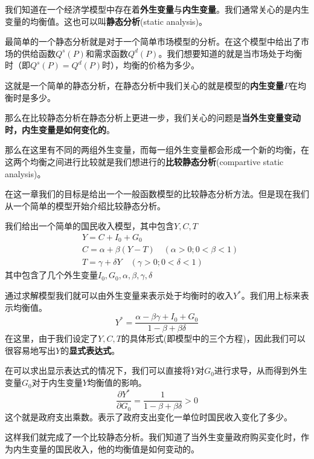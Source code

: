 \documentclass[UTF8,12pt]{ctexart}
\numberwithin{equation}{section} %
\numberwithin{figure}{section}
\numberwithin{table}{section}
\begin{document}
	我们知道在一个经济学模型中存在着\textbf{外生变量}与\textbf{内生变量}。我们通常关心的是内生变量的均衡值。这也可以叫\textbf{静态分析}(static analysis)。
	
	最简单的一个静态分析就是对于一个简单市场模型的分析。在这个模型中给出了市场的供给函数$Q^s(P)$和需求函数$Q^d(P)$。我们想要知道的就是当市场处于均衡时（即$Q^s(P)=Q^d(P)$时），均衡的价格为多少。
	
	这就是一个简单的静态分析，在静态分析中我们关心的就是模型的\textbf{内生变量}$P$在均衡时是多少。
	
	那么在比较静态分析在静态分析上更进一步，我们关心的问题是\textbf{当外生变量变动时，内生变量是如何变化的}。
	
	那么在这里有不同的两组外生变量，而每一组外生变量都会形成一个新的均衡，在这两个均衡之间进行比较就是我们想进行的\textbf{比较静态分析}(compartive static analysis)。
	
	在这一章我们的目标是给出一个一般函数模型的比较静态分析方法。但是现在我们从一个简单的模型开始介绍比较静态分析。
	
	我们给出一个简单的国民收入模型，其中包含$Y,C,T$
	\begin{equation}
		\begin{aligned}
			&Y = C + I_0 + G_0 \\
			&C = \alpha + \beta(Y-T) \quad (\alpha > 0;0< \beta < 1) \\
			&T = \gamma + \delta Y \quad (\gamma > 0; 0 < \delta < 1)
		\end{aligned}
	\end{equation}
	其中包含了几个外生变量$I_0,G_0,\alpha,\beta,\gamma,\delta$
	
	通过求解模型我们就可以由外生变量来表示处于均衡时的收入$Y^*$。我们用上标来表示均衡值。
	\begin{equation}
		Y^* = \frac{\alpha - \beta\gamma + I_0 + G_0}{1 - \beta + \beta\delta}
	\end{equation}
	在这里，由于我们设定了$Y,C,T$的具体形式(即模型中的三个方程)，因此我们可以很容易地写出$Y$的\textbf{显式表达式}。
	
	在可以求出显示表达式的情况下，我们可以直接将$Y$对$G_0$进行求导，从而得到外生变量$G_0$对于内生变量$Y$均衡值的影响。
	\begin{equation}
		\frac{\partial Y^*}{\partial G_0} = \frac{1}{1-\beta+\beta\delta} > 0
	\end{equation}
	这个就是政府支出乘数。表示了政府支出变化一单位时国民收入变化了多少。
	
	这样我们就完成了一个比较静态分析。我们知道了当外生变量政府购买变化时，作为内生变量的国民收入，他的均衡值是如何变动的。
	
\end{document}
